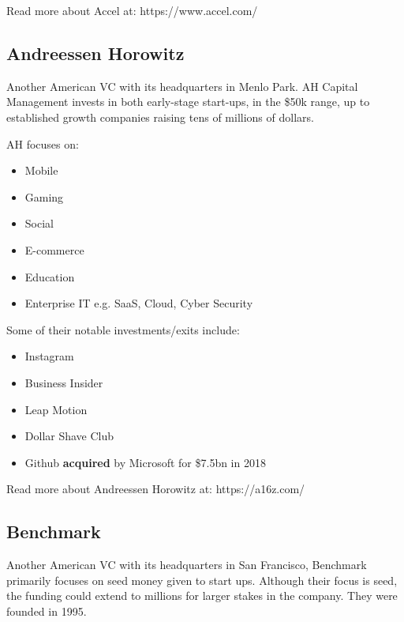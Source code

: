 \documentclass[a4paper]{article}
\begin{document}
{\vspace{5pt}
\noindent Read more about Accel at: https://www.accel.com/

\subsection{Andreessen Horowitz}
Another American VC with its headquarters in Menlo Park. AH Capital Management invests in both early-stage start-ups, in the \$50k range, up to established growth companies raising tens of millions of dollars.

\vspace{5pt}
\noindent AH focuses on:
\begin{itemize}
	\item Mobile
	\item Gaming
	\item Social
	\item E-commerce
	\item Education
	\item Enterprise IT e.g. SaaS, Cloud, Cyber Security
\end{itemize}
\vspace{5pt}
\noindent Some of their notable investments/exits include:
\begin{itemize}
	\item Instagram
	\item Business Insider
	\item Leap Motion
	\item Dollar Shave Club
	\item Github \textbf{acquired} by Microsoft for \$7.5bn in 2018
\end{itemize}

\vspace{5pt}
\noindent Read more about Andreessen Horowitz at: https://a16z.com/

\subsection{Benchmark}
Another American VC with its headquarters in San Francisco, Benchmark primarily focuses on seed money given to start ups. Although their focus is seed, the funding could extend to millions for larger stakes in the company. They were founded in 1995.

}
\end{document}
